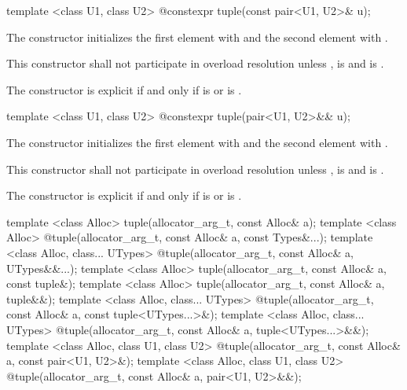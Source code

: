 %
%
\begin{itemdecl}
template <class U1, class U2> @\EXPLICIT@ constexpr tuple(const pair<U1, U2>& u);
\end{itemdecl}

\begin{itemdescr}
\pnum
\effects The constructor initializes the first element with  and the
second element with .

\pnum
\remarks This constructor shall not participate in overload resolution unless
,
 is  and
 is .

\pnum
The constructor is explicit if and only if
 is  or
 is .
\end{itemdescr}

%
%
\begin{itemdecl}
template <class U1, class U2> @\EXPLICIT@ constexpr tuple(pair<U1, U2>&& u);
\end{itemdecl}

\begin{itemdescr}
\pnum
\effects The constructor initializes the first element with
 and the
second element with .

\pnum
\remarks This constructor shall not participate in overload resolution unless
,
 is  and
 is .

\pnum
The constructor is explicit if and only if
 is  or
 is .
\end{itemdescr}

%
\begin{itemdecl}
template <class Alloc>
  tuple(allocator_arg_t, const Alloc& a);
template <class Alloc>
  @\EXPLICIT@ tuple(allocator_arg_t, const Alloc& a, const Types&...);
template <class Alloc, class... UTypes>
  @\EXPLICIT@ tuple(allocator_arg_t, const Alloc& a, UTypes&&...);
template <class Alloc>
  tuple(allocator_arg_t, const Alloc& a, const tuple&);
template <class Alloc>
  tuple(allocator_arg_t, const Alloc& a, tuple&&);
template <class Alloc, class... UTypes>
  @\EXPLICIT@ tuple(allocator_arg_t, const Alloc& a, const tuple<UTypes...>&);
template <class Alloc, class... UTypes>
  @\EXPLICIT@ tuple(allocator_arg_t, const Alloc& a, tuple<UTypes...>&&);
template <class Alloc, class U1, class U2>
  @\EXPLICIT@ tuple(allocator_arg_t, const Alloc& a, const pair<U1, U2>&);
template <class Alloc, class U1, class U2>
  @\EXPLICIT@ tuple(allocator_arg_t, const Alloc& a, pair<U1, U2>&&);
\end{itemdecl}

